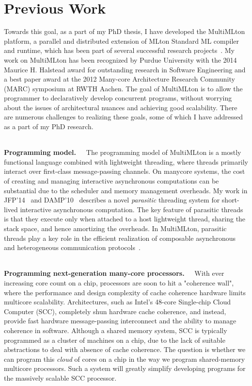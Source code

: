 \documentclass{article}
\newcommand{\R}[1]{~\\[-2mm] \noindent \textbf{#1.~~}}
\begin{document}
\section*{Previous Work}

Towards this goal, as a part of my PhD thesis, I have developed the MultiMLton
platform, a parallel and distributed extension of MLton Standard ML compiler
and runtime, which has been part of several successful research
projects~\cite{mmpar, mmgc, KC_MARC12, Ziarek11, Ziarek_ICFP09, isolates,
MMJFP}. My work on MultiMLton has been recognized by Purdue University with the
2014 Maurice H. Halstead award for outstanding research in Software Engineering
and a best paper award at the 2012 Many-core Architecture Research Community
(MARC) symposium at RWTH Aachen. The goal of MultiMLton is to allow the
programmer to declaratively develop concurrent programs, without worrying about
the issues of architectural nuances and achieving good scalability. There are
numerous challenges to realizing these goals, some of which I have addressed as
a part of my PhD research.

\R{Programming model} The programming model of MultiMLton
is a mostly functional language combined with lightweight threading, where
threads primarily interact over first-class message-passing channels. On
manycore systems, the cost of creating and managing interactive asynchronous
computations can be substantial due to the scheduler and memory management
overheads. My work in JFP'14~\cite{MMJFP} and DAMP'10~\cite{mmpar} describes a
novel \emph{parasitic} threading system for short-lived interactive
asynchronous computation. The key feature of parasitic threads is that they
execute only when attached to a host lightweight thread, sharing the stack
space, and hence amortizing the overheads. In MultiMLton, parasitic threads
play a key role in the efficient realization of composable asynchronous and
heterogeneous communication protocols~\cite{Ziarek11}.

\R{Programming next-generation many-core processors} With ever increasing core
count on a chip, processors are soon to hit a "coherence wall", where the
performance and design complexity of cache coherence hardware limits multicore
scalability. Architectures, such as Intel's 48-core Single-chip Cloud Computer
(SCC), completely shun hardware cache coherence, and instead, provide fast
hardware message-passing interconnect and the ability to manage coherence in
software. Although a shared memory system, SCC is typically programmed as a
cluster of machines on a chip, due to the lack of suitable abstractions to deal
with absence of cache coherence. The question is whether we can program this
\emph{cloud} of cores on a chip in the way we program shared-memory multicore
processors. Such a system will greatly simplify developing programs for the
massively scalable SCC processor.
\end{document}
